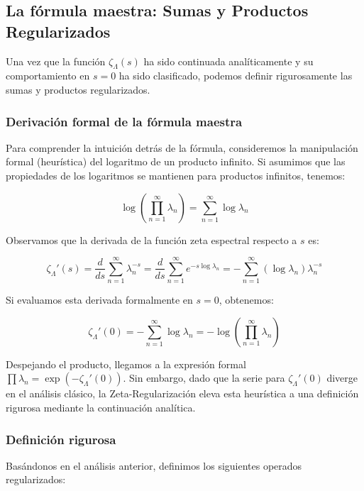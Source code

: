 \subsection{La fórmula maestra: Sumas y Productos Regularizados}

Una vez que la función $\zeta_\Lambda(s)$ ha sido continuada analíticamente y su comportamiento en $s=0$ ha sido clasificado, podemos definir rigurosamente las sumas y productos regularizados. 

\subsubsection*{Derivación formal de la fórmula maestra}

Para comprender la intuición detrás de la fórmula, consideremos la manipulación formal (heurística) del logaritmo de un producto infinito. Si asumimos que las propiedades de los logaritmos se mantienen para productos infinitos, tenemos:

$$ \log \left( \prod_{n=1}^{\infty} \lambda_n \right) = \sum_{n=1}^{\infty} \log \lambda_n $$

Observamos que la derivada de la función zeta espectral respecto a $s$ es:

$$ \zeta_\Lambda'(s) = \frac{d}{ds} \sum_{n=1}^{\infty} \lambda_n^{-s} = \frac{d}{ds} \sum_{n=1}^{\infty} e^{-s \log \lambda_n} = -\sum_{n=1}^{\infty} (\log \lambda_n) \lambda_n^{-s} $$

Si evaluamos esta derivada formalmente en $s=0$, obtenemos:

$$ \zeta_\Lambda'(0) = -\sum_{n=1}^{\infty} \log \lambda_n = -\log \left( \prod_{n=1}^{\infty} \lambda_n \right) $$

Despejando el producto, llegamos a la expresión formal $\prod \lambda_n = \exp(-\zeta_\Lambda'(0))$. Sin embargo, dado que la serie para $\zeta_\Lambda'(0)$ diverge en el análisis clásico, la Zeta-Regularización eleva esta heurística a una definición rigurosa mediante la continuación analítica.

\subsubsection*{Definición rigurosa}

Basándonos en el análisis anterior, definimos los siguientes operados regularizados:


